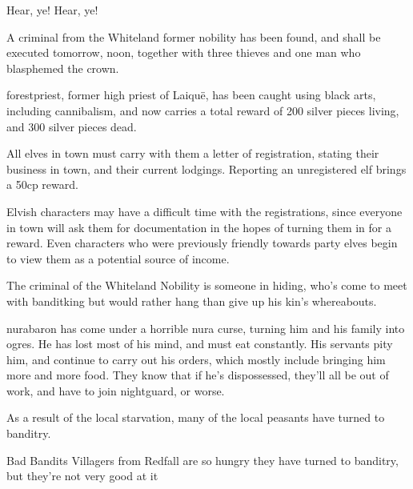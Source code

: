 \begin{multicols}{2}
\begin{speechtext}

	Hear, ye! Hear, ye!

	A criminal from the Whiteland former nobility has been found, and shall be executed tomorrow, noon, together with three thieves and one man who blasphemed the crown.

	\Gls{forestpriest}, former high priest of Laiqu\"{e}, has been caught using black arts, including cannibalism, and now carries a total reward of 200 silver pieces living, and 300 silver pieces dead.

	All elves in \gls{town} must carry with them a letter of registration, stating their business in town, and their current lodgings.
	Reporting an unregistered elf brings a 50cp reward.

\end{speechtext}

Elvish characters may have a difficult time with the registrations, since everyone in \gls{town} will ask them for documentation in the hopes of turning them in for a reward.
Even characters who were previously friendly towards party elves begin to view them as a potential source of income.

The criminal of the Whiteland Nobility is someone in hiding, who's come to meet with \gls{banditking} but would rather hang than give up his kin's whereabouts.

\stopcontents[sq]

\resumecontents[Town]

\label{desperatemeasures}

\stopcontents[Town]

\startcontents[sq]

\sqminitoc

\noindent
\gls{nurabaron} has come under a horrible nura curse, turning him and his family into ogres.
He has lost most of his mind, and must eat constantly.
His servants pity him, and continue to carry out his orders, which mostly include bringing him more and more food.
They know that if he's dispossessed, they'll all be out of work, and have to join \gls{nightguard}, or worse.

As a result of the local starvation, many of the local peasants have turned to banditry.

{\N Bad Bandits}%
{Villagers from Redfall are so hungry they have turned to banditry, but they're not very good at it}%


\end{multicols}

